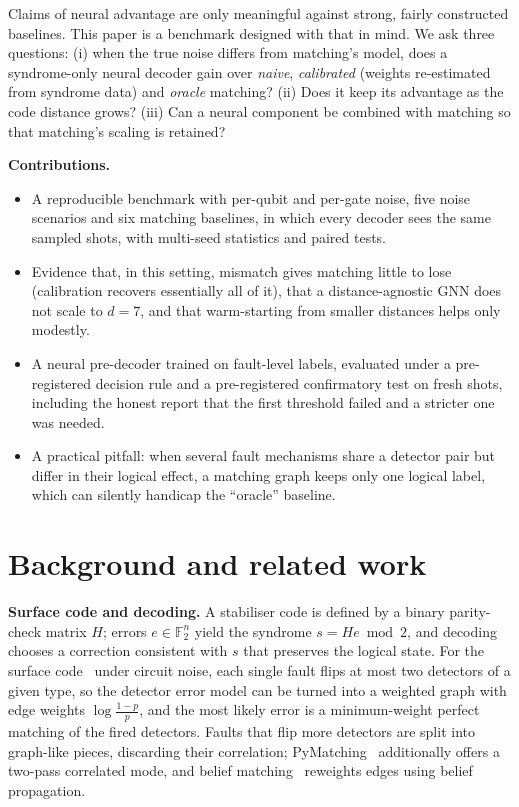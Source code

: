 \documentclass[11pt]{article}
\begin{document}
Claims of neural advantage are only meaningful against strong, fairly constructed baselines. This paper is a benchmark designed with that in mind. We ask three questions: (i) when the true noise differs from matching's model, does a syndrome-only neural decoder gain over \emph{naive}, \emph{calibrated} (weights re-estimated from syndrome data) and \emph{oracle} matching? (ii) Does it keep its advantage as the code distance grows? (iii) Can a neural component be combined with matching so that matching's scaling is retained?

\textbf{Contributions.}
\begin{itemize}
\item A reproducible benchmark with per-qubit and per-gate noise, five noise scenarios and six matching baselines, in which every decoder sees the same sampled shots, with multi-seed statistics and paired tests.
\item Evidence that, in this setting, mismatch gives matching little to lose (calibration recovers essentially all of it), that a distance-agnostic GNN does not scale to $d=7$, and that warm-starting from smaller distances helps only modestly.
\item A neural pre-decoder trained on fault-level labels, evaluated under a pre-registered decision rule and a pre-registered confirmatory test on fresh shots, including the honest report that the first threshold failed and a stricter one was needed.
\item A practical pitfall: when several fault mechanisms share a detector pair but differ in their logical effect, a matching graph keeps only one logical label, which can silently handicap the ``oracle'' baseline.
\end{itemize}

\section{Background and related work}
\textbf{Surface code and decoding.} A stabiliser code is defined by a binary parity-check matrix $H$; errors $e\in\mathbb F_2^n$ yield the syndrome $s=He \bmod 2$, and decoding chooses a correction consistent with $s$ that preserves the logical state. For the surface code~\cite{fowler2012} under circuit noise, each single fault flips at most two detectors of a given type, so the detector error model can be turned into a weighted graph with edge weights $\log\frac{1-p}{p}$, and the most likely error is a minimum-weight perfect matching of the fired detectors. Faults that flip more detectors are split into graph-like pieces, discarding their correlation; PyMatching~\cite{higgott2022,higgott2023sparse} additionally offers a two-pass correlated mode, and belief matching~\cite{higgott2023belief} reweights edges using belief propagation.
\end{document}
